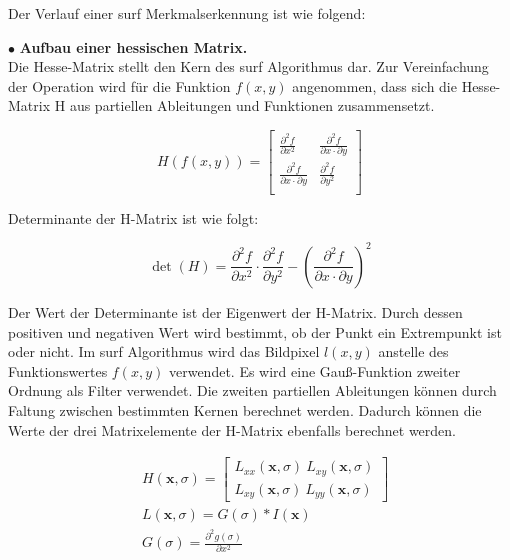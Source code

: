 Der Verlauf einer \gls{surf} Merkmalserkennung ist wie folgend:

$\bullet$ \textbf{Aufbau einer hessischen Matrix.}\\
Die Hesse-Matrix stellt den Kern des \gls{surf} Algorithmus dar. Zur Vereinfachung der Operation wird für die Funktion $f(x,y)$ angenommen, dass sich die Hesse-Matrix H aus partiellen Ableitungen und Funktionen zusammensetzt.

\begin{equation}
   H(f(x,y)) = \begin{bmatrix}
   \frac{\partial^{2}f}{\partial x^{2}} & \frac{\partial^{2}f}{\partial x \cdot \partial y} \\
   \frac{\partial^{2}f}{\partial x \cdot \partial y} & \frac{\partial^{2}f}{\partial y^{2}} \\   
   \end{bmatrix}
\end{equation}

 Determinante der H-Matrix ist wie folgt:
 
\begin{equation}
   \det(H) = \frac{\partial^{2}f}{\partial x^{2}} \cdot \frac{\partial^{2}f}{\partial y^{2}} - (\frac{\partial^{2}f}{\partial x \cdot \partial y})^2  
\end{equation}

Der Wert der Determinante ist der Eigenwert der H-Matrix. Durch dessen positiven und negativen Wert wird bestimmt, ob der Punkt ein Extrempunkt ist oder nicht. Im \gls{surf} Algorithmus wird das Bildpixel $l(x,y)$ anstelle des Funktionswertes $f(x,y)$ verwendet. Es wird eine Gauß-Funktion zweiter Ordnung als Filter verwendet. Die zweiten partiellen Ableitungen können durch Faltung zwischen bestimmten Kernen berechnet werden. Dadurch können die Werte der drei Matrixelemente der H-Matrix ebenfalls berechnet werden.

\begin{equation}
\begin{split}
   &H(\textbf{x},\sigma) = \begin{bmatrix}
   L_{xx}(\textbf{x},\sigma)\ L_{xy}(\textbf{x},\sigma) \\
   L_{xy}(\textbf{x},\sigma)\ L_{yy}(\textbf{x},\sigma)
   \end{bmatrix} \\   
   &L(\textbf{x},\sigma) = G(\sigma)*I(\textbf{x}) \\  
   &G(\sigma) = \frac{\partial^{2}g(\sigma)}{\partial x^{2}}      
\end{split}
\end{equation}

